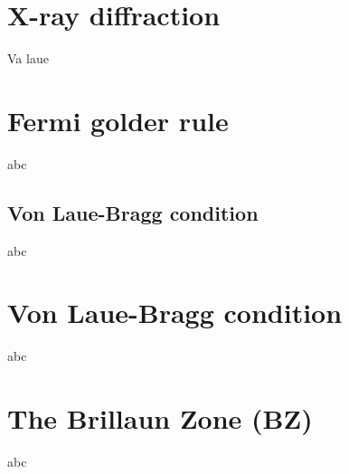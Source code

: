 \section{X-ray diffraction}
Va laue

\section{Fermi golder rule}
abc

\subsection{Von Laue-Bragg condition}
abc

\section{Von Laue-Bragg condition}
abc

\section{The Brillaun Zone (BZ)}
abc

